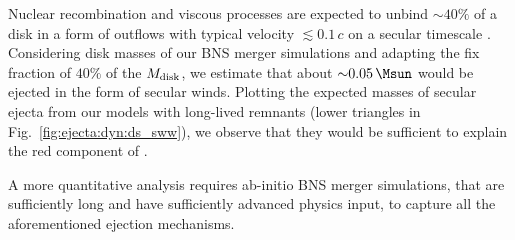 %

Nuclear recombination and viscous processes are expected to unbind 
${\sim}40\%$ of a disk in a form of outflows with typical velocity 
${\lesssim}0.1\,c$ on a secular timescale 
\citep[\eg][]{Siegel:2017nub,Fujibayashi:2017puw,Fernandez:2018kax,
    Radice:2018xqa,Fujibayashi:2020dvr}. 
%
%
Considering disk masses of our \ac{BNS} merger simulations and 
adapting the fix fraction of $40\%$ of the $M_{\rm disk}$, we estimate 
that about ${\sim}0.05\, \Msun$ would be ejected in the form of secular winds. 
%
Plotting the expected masses of secular ejecta from our models with long-lived 
remnants (lower triangles in Fig.~\ref{fig:ejecta:dyn:ds_sww}), 
we observe that they would be sufficient to explain the red component of \AT{}. 


A more quantitative analysis requires ab-initio \ac{BNS} merger simulations, 
that are sufficiently long and have sufficiently advanced physics input, to 
capture all the aforementioned ejection mechanisms. 








%
%




